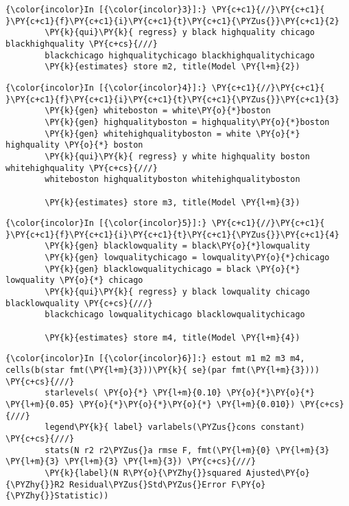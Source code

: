 \documentclass[11pt,notitlepage]{article}\usepackage[]{graphicx}\usepackage[]{color}
\makeatletter
\newenvironment{kframe}{%
 \def\at@end@of@kframe{}%
 \ifinner\ifhmode%
  \def\at@end@of@kframe{\end{minipage}}%
  \begin{minipage}{\columnwidth}%
 \fi\fi%
 \def\FrameCommand##1{\hskip\@totalleftmargin \hskip-\fboxsep
 \colorbox{shadecolor}{##1}\hskip-\fboxsep
     \hskip-\linewidth \hskip-\@totalleftmargin \hskip\columnwidth}%
 \MakeFramed {\advance\hsize-\width
   \@totalleftmargin\z@ \linewidth\hsize
   \@setminipage}}%
 {\par\unskip\endMakeFramed%
 \at@end@of@kframe}
\newenvironment{knitrout}{}{} %
\makeatother
\begin{document}
\begin{enumerate}[a)]
\begin{knitrout}
\begin{kframe}
    \begin{Verbatim}[commandchars=\\\{\}]
{\color{incolor}In [{\color{incolor}3}]:} \PY{c+c1}{//}\PY{c+c1}{ }\PY{c+c1}{f}\PY{c+c1}{i}\PY{c+c1}{t}\PY{c+c1}{\PYZus{}}\PY{c+c1}{2}
        \PY{k}{qui}\PY{k}{ regress} y black highquality chicago blackhighquality \PY{c+cs}{///}
        blackchicago highqualitychicago blackhighqualitychicago	
        \PY{k}{estimates} store m2, title(Model \PY{l+m}{2})
\end{Verbatim}

    \begin{Verbatim}[commandchars=\\\{\}]
{\color{incolor}In [{\color{incolor}4}]:} \PY{c+c1}{//}\PY{c+c1}{ }\PY{c+c1}{f}\PY{c+c1}{i}\PY{c+c1}{t}\PY{c+c1}{\PYZus{}}\PY{c+c1}{3}
        \PY{k}{gen} whiteboston = white\PY{o}{*}boston
        \PY{k}{gen} highqualityboston = highquality\PY{o}{*}boston
        \PY{k}{gen} whitehighqualityboston = white \PY{o}{*} highquality \PY{o}{*} boston
        \PY{k}{qui}\PY{k}{ regress} y white highquality boston whitehighquality \PY{c+cs}{///}
        whiteboston highqualityboston whitehighqualityboston
        
        \PY{k}{estimates} store m3, title(Model \PY{l+m}{3})
\end{Verbatim}

    \begin{Verbatim}[commandchars=\\\{\}]
{\color{incolor}In [{\color{incolor}5}]:} \PY{c+c1}{//}\PY{c+c1}{ }\PY{c+c1}{f}\PY{c+c1}{i}\PY{c+c1}{t}\PY{c+c1}{\PYZus{}}\PY{c+c1}{4}
        \PY{k}{gen} blacklowquality = black\PY{o}{*}lowquality
        \PY{k}{gen} lowqualitychicago = lowquality\PY{o}{*}chicago
        \PY{k}{gen} blacklowqualitychicago = black \PY{o}{*} lowquality \PY{o}{*} chicago
        \PY{k}{qui}\PY{k}{ regress} y black lowquality chicago blacklowquality \PY{c+cs}{///}
        blackchicago lowqualitychicago blacklowqualitychicago
        
        \PY{k}{estimates} store m4, title(Model \PY{l+m}{4})
\end{Verbatim}

    \begin{Verbatim}[commandchars=\\\{\}]
{\color{incolor}In [{\color{incolor}6}]:} estout m1 m2 m3 m4, cells(b(star fmt(\PY{l+m}{3}))\PY{k}{ se}(par fmt(\PY{l+m}{3}))) \PY{c+cs}{///}
        starlevels( \PY{o}{*} \PY{l+m}{0.10} \PY{o}{*}\PY{o}{*} \PY{l+m}{0.05} \PY{o}{*}\PY{o}{*}\PY{o}{*} \PY{l+m}{0.010}) \PY{c+cs}{///}
        legend\PY{k}{ label} varlabels(\PYZus{}cons constant) \PY{c+cs}{///}
        stats(N r2 r2\PYZus{}a rmse F, fmt(\PY{l+m}{0} \PY{l+m}{3} \PY{l+m}{3} \PY{l+m}{3} \PY{l+m}{3}) \PY{c+cs}{///}
        \PY{k}{label}(N R\PY{o}{\PYZhy{}}squared Ajusted\PY{o}{\PYZhy{}}R2 Residual\PYZus{}Std\PYZus{}Error F\PY{o}{\PYZhy{}}Statistic))
\end{Verbatim}


\end{kframe}
\end{knitrout}
\end{enumerate}
\end{document}
